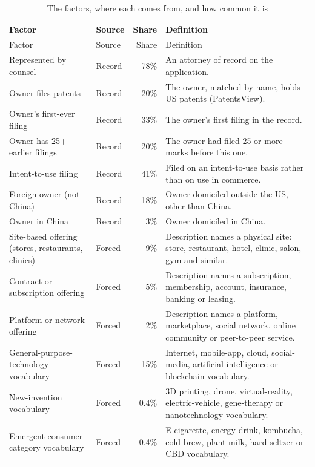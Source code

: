 \begin{small}
\begin{longtable}{>{\raggedright\arraybackslash}p{4.3cm}lr>{\raggedright\arraybackslash}p{6.6cm}}
\caption{The factors, where each comes from, and how common it is}\label{tab:factors}\\
\toprule Factor & Source & Share & Definition \\ \midrule \endfirsthead
\toprule Factor & Source & Share & Definition \\ \midrule \endhead
Represented by counsel & Record & 78\% & An attorney of record on the application. \\
Owner files patents & Record & 20\% & The owner, matched by name, holds US patents (PatentsView). \\
Owner's first-ever filing & Record & 33\% & The owner's first filing in the record. \\
Owner has 25+ earlier filings & Record & 20\% & The owner had filed 25 or more marks before this one. \\
Intent-to-use filing & Record & 41\% & Filed on an intent-to-use basis rather than on use in commerce. \\
Foreign owner (not China) & Record & 18\% & Owner domiciled outside the US, other than China. \\
Owner in China & Record & 3\% & Owner domiciled in China. \\
Site-based offering (stores, restaurants, clinics) & Forced & 9\% & Description names a physical site: store, restaurant, hotel, clinic, salon, gym and similar. \\
Contract or subscription offering & Forced & 5\% & Description names a subscription, membership, account, insurance, banking or leasing. \\
Platform or network offering & Forced & 2\% & Description names a platform, marketplace, social network, online community or peer-to-peer service. \\
General-purpose-technology vocabulary & Forced & 15\% & Internet, mobile-app, cloud, social-media, artificial-intelligence or blockchain vocabulary. \\
New-invention vocabulary & Forced & 0.4\% & 3D printing, drone, virtual-reality, electric-vehicle, gene-therapy or nanotechnology vocabulary. \\
Emergent consumer-category vocabulary & Forced & 0.4\% & E-cigarette, energy-drink, kombucha, cold-brew, plant-milk, hard-seltzer or CBD vocabulary. \\

\end{longtable}
\end{small}
